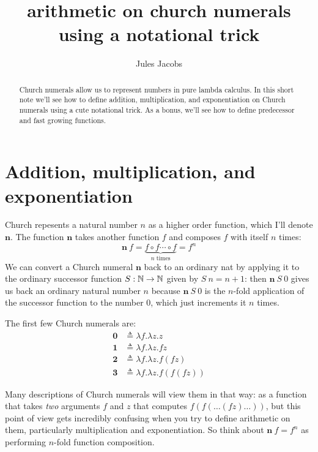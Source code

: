 

\title{arithmetic on church numerals using a notational trick}
\author{Jules Jacobs}

\maketitle

\begin{abstract}
  Church numerals allow us to represent numbers in pure lambda calculus. In this short note we'll see how to define addition, multiplication, and exponentiation on Church numerals using a cute notational trick. As a bonus, we'll see how to define predecessor and fast growing functions.
\end{abstract}

\newcommand{\ch}[1]{\mathbf{#1}}

\section{Addition, multiplication, and exponentiation}

Church repesents a natural number $n$ as a higher order function, which I'll denote $\ch{n}$.
The function $\ch{n}$ takes another function $f$ and composes $f$ with itself $n$ times:
\[
  \ch{n}\ f = \underbrace{f \circ f \cdots \circ f}_{n\text{ times}} = f^n
\]
We can convert a Church numeral $\ch{n}$ back to an ordinary nat by applying it to the ordinary successor function $S : \mathbb{N} \to \mathbb{N}$ given by $S\ n = n+1$:
then $\ch{n}\ S\ 0$ gives us back an ordinary natural number $n$ because $\ch{n}\ S\ 0$ is the $n$-fold application of the successor function to the number $0$, which just increments it $n$ times.

The first few Church numerals are:
\begin{align*}
  \ch{0} &\triangleq{} \lambda f.\lambda z. z\\
  \ch{1} &\triangleq{} \lambda f.\lambda z. f z\\
  \ch{2} &\triangleq{} \lambda f.\lambda z.f (f z)\\
  \ch{3} &\triangleq{} \lambda f.\lambda z.f (f (f z))
\end{align*}

Many descriptions of Church numerals will view them in that way: as a function that takes \emph{two} arguments $f$ and $z$ that computes $f (f (\dots (f z) \dots))$, but this point of view gets incredibly confusing when you try to define arithmetic on them, particularly multiplication and exponentiation.
So think about $\ch{n}\ f = f^n$ as performing $n$-fold function composition.

